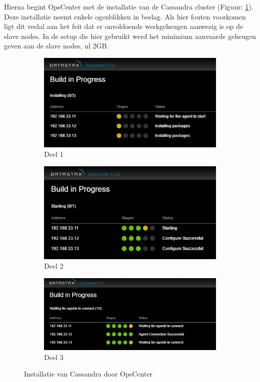 Hierna begint OpsCenter met de installatie van de Cassandra cluster (Figuur: \ref{fig:cas_install}).
Deze installatie neemt enkele ogenblikken in beslag.
Als hier fouten voorkomen ligt dit veelal aan het feit dat er onvoldoende werkgeheugen aanwezig is op de slave nodes.
In de setup die hier gebruikt werd het minimium aanvaarde geheugen geven aan de slave nodes, nl 2GB.

\begin{figure}[H]
	\centering
	\begin{subfigure}{.49\textwidth}
  		\centering
  		\includegraphics[width=.9\linewidth]{img/4_1_installatie_cassandra/1_Configuration_part_4}
  		\caption{Deel 1}
	\end{subfigure}
	\begin{subfigure}{.49\textwidth}
  		\centering
  		\includegraphics[width=.9\linewidth]{img/4_1_installatie_cassandra/1_Configuration_part_5}
  		\caption{Deel 2}
	\end{subfigure}
	\begin{subfigure}{.49\textwidth}
  		\centering
  		\includegraphics[width=.9\linewidth]{img/4_1_installatie_cassandra/1_Configuration_part_6}
  		\caption{Deel 3}
	\end{subfigure}
	\caption{Installatie van Cassandra door OpsCenter}
	\label{fig:cas_install}
\end{figure}